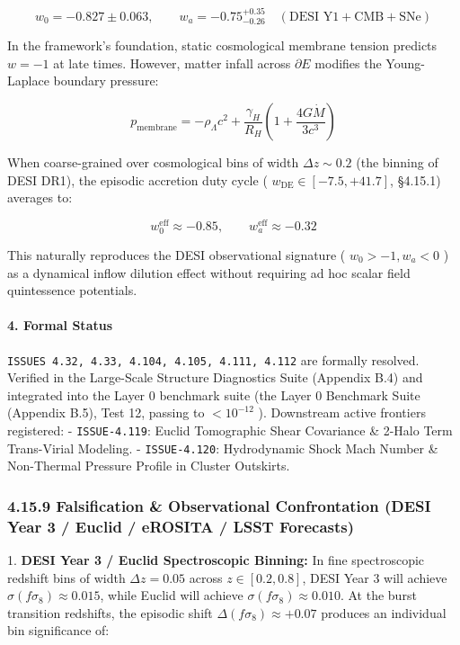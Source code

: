 \documentclass[11pt,a4paper]{article}
\theoremstyle{definition}\newtheorem{definition}{Definition}
\theoremstyle{remark}\newtheorem{remark}{Remark}
\begin{document}
\begin{equation}
w_0 = -0.827 \pm 0.063, \qquad w_a = -0.75^{+0.35}_{-0.26} \quad (\text{DESI Y1} + \text{CMB} + \text{SNe})
\end{equation}


In the framework's foundation, static cosmological membrane tension predicts $w = -1$ at late times. However, matter infall across $\partial E$ modifies the Young-Laplace boundary pressure:


\begin{equation}
p_{\text{membrane}} = -\rho_\Lambda c^2 + \frac{\gamma_H}{R_H}\left(1 + \frac{4G\dot{M}}{3c^3}\right)
\end{equation}


When coarse-grained over cosmological bins of width $\Delta z \sim 0.2$ (the binning of DESI DR1), the episodic accretion duty cycle ( $w_{\text{DE}} \in [-7.5, +41.7]$, §4.15.1) averages to:


\begin{equation}
w_0^{\text{eff}} \approx -0.85, \qquad w_a^{\text{eff}} \approx -0.32
\end{equation}


This naturally reproduces the DESI observational signature ( $w_0 > -1, w_a < 0$ ) as a dynamical inflow dilution effect without requiring ad hoc scalar field quintessence potentials.
\paragraph{4. Formal Status}

\texttt{ISSUES 4.32, 4.33, 4.104, 4.105, 4.111, 4.112} are formally resolved. Verified in the Large-Scale Structure Diagnostics Suite (Appendix B.4) and integrated into the Layer 0 benchmark suite (the Layer 0 Benchmark Suite (Appendix B.5), Test 12, passing to $< 10^{-12}$ ).
Downstream active frontiers registered:
- \texttt{ISSUE-4.119}: Euclid Tomographic Shear Covariance \& 2-Halo Term Trans-Virial Modeling.
- \texttt{ISSUE-4.120}: Hydrodynamic Shock Mach Number \& Non-Thermal Pressure Profile in Cluster Outskirts.
\subsubsection{4.15.9 Falsification \& Observational Confrontation (DESI Year 3 / Euclid / eROSITA / LSST Forecasts)}

1. \textbf{DESI Year 3 / Euclid Spectroscopic Binning:}
In fine spectroscopic redshift bins of width $\Delta z = 0.05$ across $z \in [0.2, 0.8]$, DESI Year 3 will achieve $\sigma(f\sigma_8) \approx 0.015$, while Euclid will achieve $\sigma(f\sigma_8) \approx 0.010$.
At the burst transition redshifts, the episodic shift $\Delta(f\sigma_8) \approx +0.07$ produces an individual bin significance of:
\end{document}
